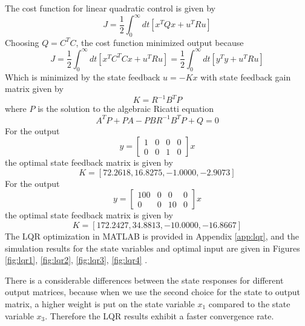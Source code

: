 \documentclass[12pt]{article}
\numberwithin{equation}{section}
\begin{document}
The cost function for linear quadratic control is given by
\begin{equation}
    J = \frac{1}{2}\int_{0}^{\infty}dt\left[x^T Q x + u^T R u\right]
\end{equation}
Choosing $Q = C^T C$, the cost function minimized output because
\begin{equation}
    J = \frac{1}{2}\int_{0}^{\infty}dt\left[x^T C^T C x + u^T R u\right] = \frac{1}{2}\int_{0}^{\infty}dt\left[y^T y + u^T R u\right]   
\end{equation}
Which is minimized by the state feedback $u = - K x$ with state feedback gain matrix given by
\begin{equation}
    K = R^{-1} B^T P
\end{equation}
where $P$ is the solution to the algebraic Ricatti equation
\begin{equation}
    A^T P + P A - P B R^{-1} B^T P + Q = 0
\end{equation}
For the output
\begin{equation}
    y =
    \begin{bmatrix}
        1 & 0 & 0 & 0\\
        0 & 0 & 1 & 0
    \end{bmatrix}
    x
\end{equation}
the optimal state feedback matrix is given by
\begin{equation}
    K = [72.2618,   16.8275,   -1.0000,   -2.9073]
\end{equation}
For the output
\begin{equation}
    y =
    \begin{bmatrix}
        100 & 0 & 0 & 0\\
        0 & 0 & 10 & 0
    \end{bmatrix}
    x
\end{equation}
the optimal state feedback matrix is given by
\begin{equation}
    K = [172.2427,   34.8813,  -10.0000,  -16.8667]
\end{equation}
The LQR optimization in MATLAB is provided in Appendix \ref{app:lqr}, and the simulation results for the state variables and optimal input are given in Figures \ref{fig:lqr1}, \ref{fig:lqr2}, \ref{fig:lqr3}, \ref{fig:lqr4} .

There is a considerable differences between the state responses for different output matrices, because when we use the second choice for the state to output matrix, a higher weight is put on the state variable $x_1$ compared to the state variable $x_3$. Therefore the LQR results exhibit a faster convergence rate.
\end{document}

